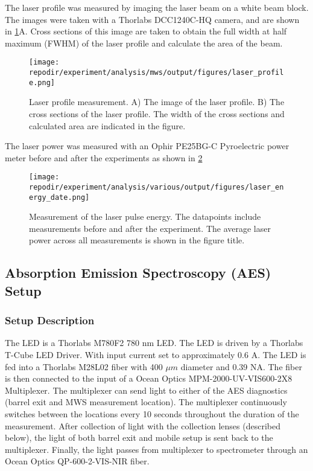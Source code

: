 The laser profile was measured by imaging the laser beam on a white beam block. The images were taken with a Thorlabs DCC1240C-HQ camera, and are shown in \ref{fig:SI_Laser_Profile}A. Cross sections of this image are taken to obtain the full width at half maximum (FWHM) of the laser profile and calculate the area of the beam.  

\begin{figure}[H]
\centering
\texttt{[image: \\repodir/experiment/analysis/mws/output/figures/laser\_profile.png]}
\caption{Laser profile measurement. A) The image of the laser profile. B) The cross sections of the laser profile. The width of the cross sections and calculated area are indicated in the figure.}
\label{fig:SI_Laser_Profile}
\end{figure}

The laser power was measured with an Ophir PE25BG-C Pyroelectric power meter before and after the experiments as shown in \ref{fig:SI_Laser_Energy} 



\begin{figure}[H]
\centering
\texttt{[image: \\repodir/experiment/analysis/various/output/figures/laser\_energy\_date.png]}
\caption{Measurement of the laser pulse energy. The datapoints include measurements before and after the experiment. The average laser power across all measurements is shown in the figure title. }
\label{fig:SI_Laser_Energy}
\end{figure}


\clearpage
\subsection{Absorption Emission Spectroscopy (AES) Setup}

\subsubsection{Setup Description}

The LED is a Thorlabs M780F2 780 nm LED. The LED is driven by a Thorlabs T-Cube LED Driver. With input current set to approximately 0.6 A. The LED is fed into a Thorlabs M28L02 fiber with 400 $\mu m$ diameter and 0.39 NA. The fiber is then connected to the input of a  Ocean Optics MPM-2000-UV-VIS600-2X8 Multiplexer.  The multiplexer can send light to either of the AES diagnostics (barrel exit and MWS measurement location). The multiplexer continuously switches between the locations every 10 seconds throughout the duration of the measurement. After collection of light with the collection lenses (described below), the light of both barrel exit and mobile setup is sent back to the multiplexer. Finally, the light passes from multiplexer to spectrometer through an Ocean Optics QP-600-2-VIS-NIR fiber.

